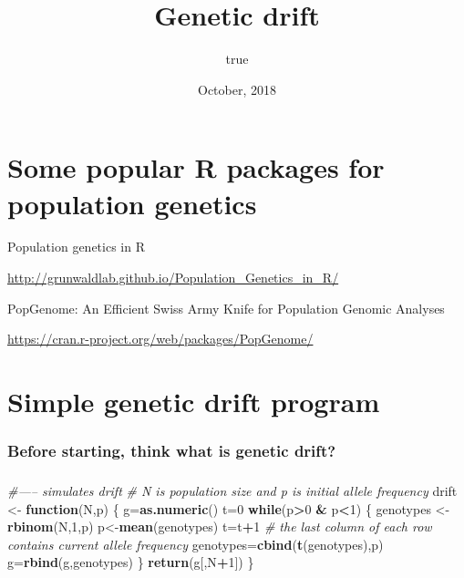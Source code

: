 \documentclass[]{article}
\title{Genetic drift}
\author{true}
\date{October, 2018}
\newenvironment{Shaded}{\begin{snugshade}}{\end{snugshade}}
\newcommand{\KeywordTok}[1]{\textcolor[rgb]{0.13,0.29,0.53}{\textbf{#1}}}
\newcommand{\DecValTok}[1]{\textcolor[rgb]{0.00,0.00,0.81}{#1}}
\newcommand{\StringTok}[1]{\textcolor[rgb]{0.31,0.60,0.02}{#1}}
\newcommand{\CommentTok}[1]{\textcolor[rgb]{0.56,0.35,0.01}{\textit{#1}}}
\newcommand{\ControlFlowTok}[1]{\textcolor[rgb]{0.13,0.29,0.53}{\textbf{#1}}}
\newcommand{\OperatorTok}[1]{\textcolor[rgb]{0.81,0.36,0.00}{\textbf{#1}}}
\newcommand{\NormalTok}[1]{#1}
\begin{document}
\maketitle

{
\setcounter{tocdepth}{1}
\tableofcontents
}
\section{Some popular R packages for population
genetics}\label{some-popular-r-packages-for-population-genetics}

Population genetics in R

\url{http://grunwaldlab.github.io/Population_Genetics_in_R/}

PopGenome: An Efficient Swiss Army Knife for Population Genomic Analyses

\url{https://cran.r-project.org/web/packages/PopGenome/}

\section{Simple genetic drift
program}\label{simple-genetic-drift-program}

\subsubsection{Before starting, think what is genetic
drift?}\label{before-starting-think-what-is-genetic-drift}

\subsubsection{}\label{section}

\begin{Shaded}
\begin{Highlighting}[]
\CommentTok{#----- simulates drift}
\CommentTok{# N is population size and p is initial allele frequency}
\NormalTok{drift <-}\StringTok{ }\ControlFlowTok{function}\NormalTok{(N,p) \{}
\NormalTok{   g=}\KeywordTok{as.numeric}\NormalTok{()}
\NormalTok{   t=}\DecValTok{0}
   \ControlFlowTok{while}\NormalTok{(p}\OperatorTok{>}\DecValTok{0} \OperatorTok{&}\StringTok{ }\NormalTok{p}\OperatorTok{<}\DecValTok{1}\NormalTok{) \{}
\NormalTok{      genotypes <-}\StringTok{ }\KeywordTok{rbinom}\NormalTok{(N,}\DecValTok{1}\NormalTok{,p)}
\NormalTok{      p<-}\KeywordTok{mean}\NormalTok{(genotypes)}
\NormalTok{      t=t}\OperatorTok{+}\DecValTok{1}
      \CommentTok{# the last column of each row contains current allele frequency}
\NormalTok{      genotypes=}\KeywordTok{cbind}\NormalTok{(}\KeywordTok{t}\NormalTok{(genotypes),p)}
\NormalTok{      g=}\KeywordTok{rbind}\NormalTok{(g,genotypes)}
\NormalTok{   \}}
   \KeywordTok{return}\NormalTok{(g[,N}\OperatorTok{+}\DecValTok{1}\NormalTok{])}
\NormalTok{\}}
\end{Highlighting}
\end{Shaded}
\end{document}

